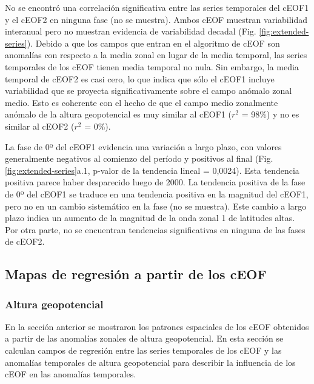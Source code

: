 \documentclass[12pt,oneside,a4paper]{reedthesis}
\begin{document}
No se encontró una correlación significativa entre las series temporales del cEOF1 y el cEOF2 en ninguna fase (no se muestra).
Ambos cEOF muestran variabilidad interanual pero no muestran evidencia de variabilidad decadal (Fig. \ref{fig:extended-series}).
Debido a que los campos que entran en el algoritmo de cEOF son anomalías con respecto a la media zonal en lugar de la media temporal, las series temporales de los cEOF tienen media temporal no nula.
Sin embargo, la media temporal de cEOF2 es casi cero, lo que indica que sólo el cEOF1 incluye variabilidad que se proyecta significativamente sobre el campo anómalo zonal medio.
Esto es coherente con el hecho de que el campo medio zonalmente anómalo de la altura geopotencial es muy similar al cEOF1 (\(r^2\) = 98\%) y no es similar al cEOF2 (\(r^2\) = 0\%).

La fase de 0º del cEOF1 evidencia una variación a largo plazo, con valores generalmente negativos al comienzo del período y positivos al final (Fig. \ref{fig:extended-series}a.1, p-valor de la tendencia lineal = 0,0024).
Esta tendencia positiva parece haber desparecido luego de 2000.
La tendencia positiva de la fase de 0º del cEOF1 se traduce en una tendencia positiva en la magnitud del cEOF1, pero no en un cambio sistemático en la fase (no se muestra).
Este cambio a largo plazo indica un aumento de la magnitud de la onda zonal 1 de latitudes altas.
Por otra parte, no se encuentran tendencias significativas en ninguna de las fases de cEOF2.

\hypertarget{mapas-de-regresiuxf3n-a-partir-de-los-ceof}{%
\subsection{Mapas de regresión a partir de los cEOF}\label{mapas-de-regresiuxf3n-a-partir-de-los-ceof}}

\hypertarget{altura-geopotencial}{%
\subsubsection{Altura geopotencial}\label{altura-geopotencial}}

En la sección anterior se mostraron los patrones espaciales de los cEOF obtenidos a partir de las anomalías zonales de altura geopotencial.
En esta sección se calculan campos de regresión entre las series temporales de los cEOF y las anomalías temporales de altura geopotencial para describir la influencia de los cEOF en las anomalías temporales.
\end{document}
